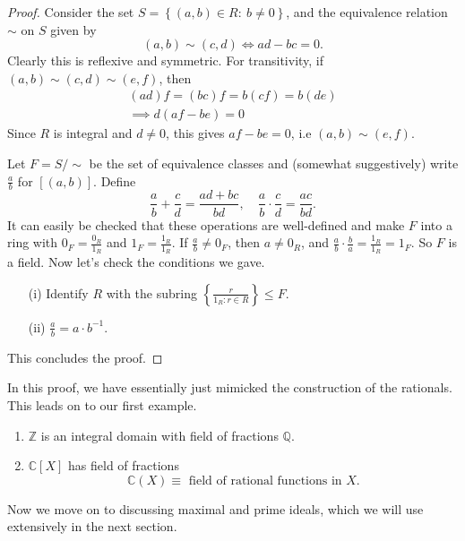 \documentclass[egregdoesnotlikesansseriftitles,a4paper]{scrartcl}
\begin{document}
\begin{proof}
       Consider the set $S=\left\{(a,b)\in R: \ b \neq 0\right\}$, and the equivalence relation $\sim$ on $S$ given by \[
       (a,b)\sim (c,d) \iff ad-bc=0
       .\] Clearly this is reflexive and symmetric. For transitivity, if $(a,b)\sim (c,d) \sim (e,f)$, then 
       \begin{align*}
            (ad)f=(bc)f=b (cf)=b (de )\\
            \implies d (af-be)=0
       \end{align*}
       Since $R$ is integral and $d \neq 0$, this gives $af-be =0$, i.e $(a,b)\sim (e,f)$.

       Let $F=S/\sim$ be the set of equivalence classes and (somewhat suggestively) write $\frac{a}{b}$ for $[(a,b)]$. Define \[
       \frac{a}{b}+\frac{c}{d}= \frac{ad+bc}{bd}, \quad \frac{a}{b}\cdot \frac{c}{d}=\frac{ac}{bd}
       .\] It can easily be checked that these operations are well-defined and make $F$ into a ring with $0_{F}= \frac{0_{R}}{1_{R}}$ and $1_{F}= \frac{1_{R}}{1_{R}}$. If $\frac{a}{b}\neq 0_{F}$, then $a \neq 0_{R}$, and $\frac{a}{b}\cdot \frac{b}{a}= \frac{1_{R}}{1_{R}}=1_{F}$. So $F$ is a field. Now let's check the conditions we gave.
       \begin{itemize}
             \item[(i)] Identify $R$ with the subring $\left\{\frac{r}{1_{R}: r \in R}\right\} \leq F$.
             \item[(ii)] $\frac{a}{b}=a \cdot b^{-1}$.
       \end{itemize}
       This concludes the proof.
\end{proof}
\begin{remark}
       In this proof, we have essentially just mimicked the construction of the rationals. This leads on to our first example.
\end{remark}
\begin{example*}
       \begin{enumerate}
             \item $\mathbb{Z}$ is an integral domain with field of fractions $\mathbb{Q}$.
             \item $\mathbb{C}[X]$ has field of fractions \[
             \mathbb{C}(X)\equiv \text{ field of rational functions in } X
             .\] 
       \end{enumerate}
\end{example*}
Now we move on to discussing maximal and prime ideals, which we will use extensively in the next section.
\end{document}

